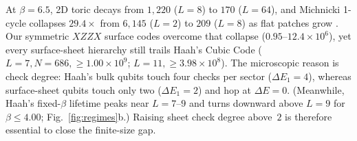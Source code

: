 \documentclass[aps,prx,reprint,superscriptaddress,nofootinbib,floatfix]{revtex4-2}
\begin{document}
At $\beta = 6.5$, 2D toric decays from $1{,}220$ ($L = 8$) to $170$ ($L = 64$), and Michnicki 1-cycle collapses $29.4\times$ from $6{,}145$ ($L = 2$) to $209$ ($L = 8$) as flat patches grow \cite{siva2017}. Our symmetric $XZZX$ surface codes overcome that collapse ($0.95\text{--}12.4 \times 10^6$), yet every surface-sheet hierarchy still trails Haah's Cubic Code ($L = 7, N = 686, \ge 1.00 \times 10^9$; $L = 11, \ge 3.98 \times 10^8$). The microscopic reason is check degree: Haah's bulk qubits touch four checks per sector ($\Delta E_1 = 4$), whereas surface-sheet qubits touch only two ($\Delta E_1 = 2$) and hop at $\Delta E = 0$. (Meanwhile, Haah's fixed-$\beta$ lifetime peaks near $L = 7\text{--}9$ and turns downward above $L = 9$ for $\beta \le 4.00$; Fig.~\ref{fig:regimes}b.) Raising sheet check degree above~$2$ is therefore essential to close the finite-size gap.
\end{document}
